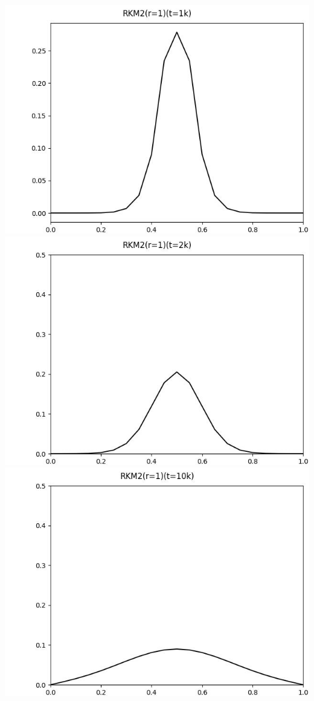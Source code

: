\documentclass[12pt]{ctexart}
\begin{document}
\includegraphics[scale=0.35]{RKM2(r=1)(t=1k).jpg}
\includegraphics[scale=0.35]{RKM2(r=1)(t=2k).jpg}
\includegraphics[scale=0.35]{RKM2(r=1)(t=10k).jpg}
\end{document}
